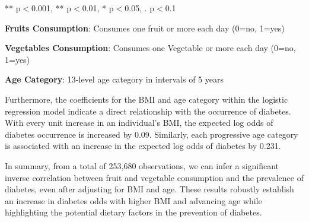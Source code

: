 \documentclass[11pt]{article}
\begin{document}
\begin{table}[h]
\caption{Multiple Logistic Regression Model: predicting diabetes with fruit and vegetable consumption, while controlling for Body Mass Index and Age.}
\label{table:multi_logit_model}
\begin{threeparttable}
\renewcommand{\TPTminimum}{\linewidth}
\begin{tablenotes}
\footnotesize
\item *** p$<$0.001, ** p$<$0.01, * p$<$0.05, . p$<$0.1
\item \textbf{Fruits Consumption}: Consumes one fruit or more each day (0=no, 1=yes)
\item \textbf{Vegetables Consumption}: Consumes one Vegetable or more each day (0=no, 1=yes)
\item \textbf{Age Category}: 13-level age category in intervals of 5 years
\end{tablenotes}
\end{threeparttable}
\end{table}


Furthermore, the coefficients for the BMI and age category within the logistic regression model indicate a direct relationship with the occurrence of diabetes. With every unit increase in an individual's BMI, the expected log odds of diabetes occurrence is increased by 0.09. Similarly, each progressive age category is associated with an increase in the expected log odds of diabetes by 0.231.

In summary, from a total of 253,680 observations, we can infer a significant inverse correlation between fruit and vegetable consumption and the prevalence of diabetes, even after adjusting for BMI and age. These results robustly establish an increase in diabetes odds with higher BMI and advancing age while highlighting the potential dietary factors in the prevention of diabetes.
\end{document}
